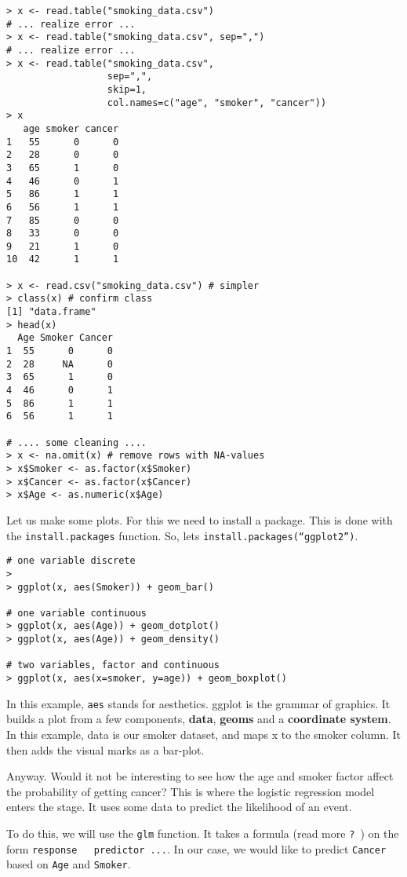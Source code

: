 \documentclass{article}[11pt]
\begin{document}
\begin{verbatim}
> x <- read.table("smoking_data.csv")
# ... realize error ...
> x <- read.table("smoking_data.csv", sep=",")
# ... realize error ...
> x <- read.table("smoking_data.csv", 
                  sep=",", 
                  skip=1, 
                  col.names=c("age", "smoker", "cancer"))
> x
   age smoker cancer
1   55      0      0
2   28      0      0
3   65      1      0
4   46      0      1
5   86      1      1
6   56      1      1
7   85      0      0
8   33      0      0
9   21      1      0
10  42      1      1

> x <- read.csv("smoking_data.csv") # simpler
> class(x) # confirm class
[1] "data.frame"
> head(x)
  Age Smoker Cancer
1  55      0      0
2  28     NA      0
3  65      1      0
4  46      0      1
5  86      1      1
6  56      1      1

# .... some cleaning ....
> x <- na.omit(x) # remove rows with NA-values
> x$Smoker <- as.factor(x$Smoker)
> x$Cancer <- as.factor(x$Cancer)
> x$Age <- as.numeric(x$Age)
\end{verbatim}

Let us make some plots. For this we need to install a package. This is
done with the \texttt{install.packages} function. So, lets
\texttt{install.packages(``ggplot2'')}.


\begin{verbatim}
# one variable discrete
> 
> ggplot(x, aes(Smoker)) + geom_bar()

# one variable continuous
> ggplot(x, aes(Age)) + geom_dotplot()
> ggplot(x, aes(Age)) + geom_density()

# two variables, factor and continuous
> ggplot(x, aes(x=smoker, y=age)) + geom_boxplot()
\end{verbatim}

In this example, \texttt{aes} stands for aesthetics. ggplot is the
grammar of graphics. It builds a plot from a few components,
\textbf{data}, \textbf{geoms} and a \textbf{coordinate system}. In
this example, data is our smoker dataset, and maps x to the
smoker column. It then adds the visual marks as a bar-plot.

Anyway. Would it not be interesting to see how the age and smoker
factor affect the probability of getting cancer? This is where the
logistic regression model enters the stage. It uses some data to
predict the likelihood of an event.

To do this, we will use the \texttt{glm} function. It takes a formula
(read more \texttt{?~}) on the form \texttt{response ~ predictor
  ...}. In our case, we would like to predict \texttt{Cancer} based on
\texttt{Age} and \texttt{Smoker}.
\end{document}
